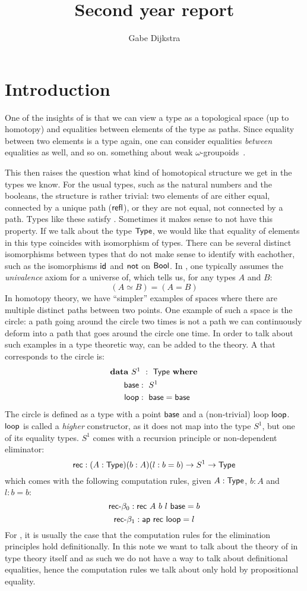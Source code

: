 \documentclass[a4paper,10pt]{article}
\title{Second year report}
\author{Gabe Dijkstra}
\begin{document}
\maketitle

\section{Introduction}
\label{sec:introduction}

One of the insights of \hott is that we can view a type as a
topological space (up to homotopy) and equalities between elements of
the type as paths. Since equality between two elements is a type
again, one can consider equalities \emph{between} equalities as well,
and so on. something about weak $\omega$-groupoids~\cite{VanDenBerg2008}.

This then raises the question what kind of homotopical structure we
get in the types we know. For the usual types, such as the natural
numbers and the booleans, the structure is rather trivial: two
elements of are either equal, connected by a unique path ($\operatorname{\mathsf{refl}}$), or
they are not equal, \ie not connected by a path. Types like these
satisfy \emph{\uip}. Sometimes it makes sense to not have this
property. If we talk about the type $\mathsf{Type}$, we would like that
equality of elements in this type coincides with isomorphism of
types. There can be several distinct isomorphisms between types that
do not make sense to identify with eachother, such as the isomorphisms
$\mathsf{id}_{}$ and $\operatorname{\mathsf{not}}$ on $\operatorname{\mathsf{Bool}}$. In \hott, one typically assumes the
\emph{univalence} axiom for a universe of, which tells us, for any
types $A$ and $B$:
$$
(A \simeq B) = (A = B)
$$
In homotopy theory, we have ``simpler'' examples of spaces where there
are multiple distinct paths between two points. One example of such a
space is the circle: a path going around the circle two times is not a
path we can continuously deform into a path that goes around the
circle one time. In order to talk about such examples in a type
theoretic way, \emph{\hits} can be added to the theory. A \hit that
corresponds to the circle is:
%
\begin{alignat*}{2}
  &\rlap{$\data\ S^1\ :\ \Type\ \where$} \\
  &&\ \ \base     &:\ S^1 \\
  &&\ \ \loopcstr &:\ \base = \base
\end{alignat*}
%
The circle is defined as a type with a point $\mathsf{base}$ and a
(non-trivial) loop $\mathsf{loop}$. $\mathsf{loop}$ is called a \emph{higher}
constructor, as it does not map into the type $S^1$, but one of its
equality types. $S^1$ comes with a recursion principle or
non-dependent eliminator:
$$
\mathsf{rec} : (A : \mathsf{Type}) (b : A) (l : b = b) \to S^1 \to \mathsf{Type}
$$
which comes with the following computation rules, given $A : \mathsf{Type}$,
$b : A$ and $l : b = b$:
$$
\mathsf{rec}\mbox{-}\beta_0 : \mathsf{rec}\ A\ b\ l\ \mathsf{base} = b
$$
$$
\rec\mbox{-}\beta_1 : \ap\ \rec\ \loopcstr = l
$$
For \oits, it is usually the case that the computation rules for the
elimination principles hold definitionally. In this note we want to
talk about the theory of \hits in type theory itself and as such we do
not have a way to talk about definitional equalities, hence the
computation rules we talk about only hold by propositional equality.
\end{document}
